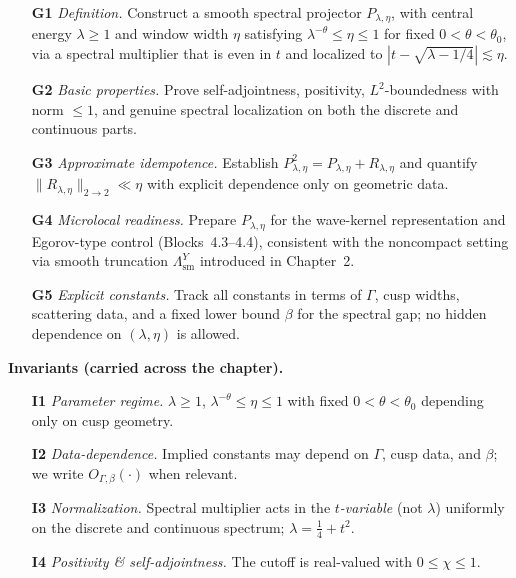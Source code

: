 \begin{itemize}
  \item[\textbf{G1}] \emph{Definition.} Construct a smooth spectral projector $P_{\lambda,\eta}$,
  with central energy $\lambda\ge 1$ and window width $\eta$ satisfying
  $\lambda^{-\theta}\le \eta\le 1$ for fixed $0<\theta<\theta_0$, via a spectral multiplier
  that is even in $t$ and localized to $|t-\sqrt{\lambda-1/4}|\lesssim \eta$.

  \item[\textbf{G2}] \emph{Basic properties.} Prove self-adjointness, positivity,
  $L^2$-boundedness with norm $\le 1$, and genuine spectral localization on both the discrete and continuous parts.

  \item[\textbf{G3}] \emph{Approximate idempotence.} Establish
  $P_{\lambda,\eta}^2=P_{\lambda,\eta}+R_{\lambda,\eta}$ and quantify
  $\|R_{\lambda,\eta}\|_{2\to 2}\ll \eta$ with explicit dependence only on geometric data.

  \item[\textbf{G4}] \emph{Microlocal readiness.} Prepare $P_{\lambda,\eta}$ for the wave-kernel
  representation and Egorov-type control (Blocks~4.3--4.4), consistent with the noncompact setting via smooth truncation $\Lambda^Y_{\mathrm{sm}}$ introduced in Chapter~2.

  \item[\textbf{G5}] \emph{Explicit constants.} Track all constants in terms of
  $\Gamma$, cusp widths, scattering data, and a fixed lower bound $\beta$ for the spectral gap; no hidden dependence on $(\lambda,\eta)$ is allowed.
\end{itemize}

\noindent\textbf{Invariants (carried across the chapter).}
\begin{itemize}
  \item[\textbf{I1}] \emph{Parameter regime.} $\lambda\ge 1$, $\lambda^{-\theta}\le \eta\le 1$ with fixed $0<\theta<\theta_0$ depending only on cusp geometry.
  \item[\textbf{I2}] \emph{Data-dependence.} Implied constants may depend on $\Gamma$, cusp data, and $\beta$; we write $O_{\Gamma,\beta}(\cdot)$ when relevant.
  \item[\textbf{I3}] \emph{Normalization.} Spectral multiplier acts in the \emph{$t$-variable} (not $\lambda$) uniformly on the discrete and continuous spectrum; $\lambda=\tfrac14+t^2$.
  \item[\textbf{I4}] \emph{Positivity \& self-adjointness.} The cutoff is real-valued with $0\le \chi\le 1$.
\end{itemize}

